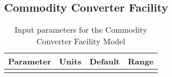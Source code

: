 \subsection{Commodity Converter Facility}


\begin{table}[h!]
\centering
\begin{tabular}{|l|r|r|r|}
\hline
\textbf{Parameter} & \textbf{Units} & \textbf{Default} & \textbf{Range}\\
\hline
& & & \\
\hline
\end{tabular}
\caption{Input parameters for the Commodity Converter Facility Model}
\label{tab:commodconverter}
\end{table}

